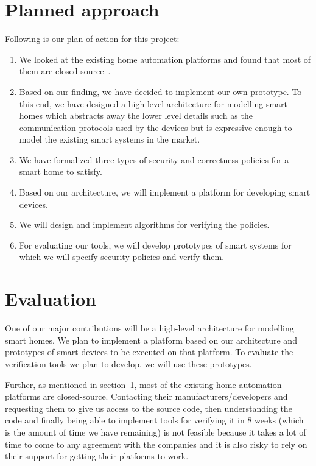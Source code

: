 \documentclass{article}
\begin{document}
\section{Planned approach}
\label{sec:plannedapp}
Following is our plan of action for this project:
\begin{enumerate}
\item We looked at the existing home automation platforms and found that most of them are closed-source~\cite{homeos, echo, wink, homekit, samsung}.  
\item Based on our finding, we have decided to implement our own prototype. To this end, we have designed a high level architecture for modelling smart homes which abstracts away the lower level details such as the communication protocols used by the devices but is expressive enough to model the existing smart systems in the market. 
\item  We have formalized three types of security and correctness policies for a smart home to satisfy. 
\item Based on our architecture, we will implement a platform for developing smart devices.
\item We will design and implement algorithms for verifying the policies.
\item For evaluating our tools, we will develop prototypes of smart systems for which we will specify security policies and verify them.
\end{enumerate}

\section{Evaluation}
One of our major contributions will be a high-level architecture for modelling smart homes. We plan to implement a platform based on our architecture and prototypes of smart devices to be executed on that platform. To evaluate the verification tools we plan to develop, we will use these prototypes. 

Further, as mentioned in section~\ref{sec:plannedapp}, most of the existing home automation platforms are closed-source. Contacting their manufacturers/developers and requesting them to give us access to the source code, then understanding the code and finally being able to implement tools for verifying it in 8 weeks (which is the amount of time we have remaining) is not feasible because it takes a lot of time to come to any agreement with the companies and it is also risky to rely on their support for getting their platforms to work.    
\end{document}
